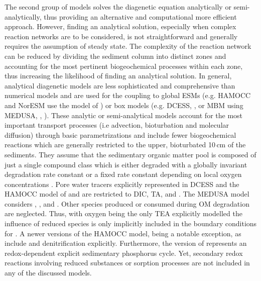 \documentclass[gmd, manuscript]{copernicus}
\begin{document}
The second group of models solves the diagenetic equation analytically or semi-analytically, thus providing an alternative and computational more efficient approach. 
However, finding an analytical solution, especially when complex reaction networks are to be considered, is not straightforward and generally requires the assumption of steady state. 
The complexity of the reaction network can be reduced by dividing the sediment column into distinct zones and accounting for the most pertinent biogeochemical processes 
within each zone, thus increasing the likelihood of finding an analytical solution. %
In general, analytical diagenetic models are less sophisticated and comprehensive than numerical models and are used for the coupling 
to global ESMs (e.g. HAMOCC and NorESM use the model of \citet{heinze_global_1999}) or box models (e.g. DCESS, \citeauthor{shaffer_presentation_2008}, \citeyear{shaffer_presentation_2008} or 
MBM using MEDUSA, \citeauthor{munhoven_glacialinterglacial_2007}, \citeyear{munhoven_glacialinterglacial_2007}). 
These analytic or semi-analytical models  account for the most important transport processes (i.e advection, bioturbation and molecular diffusion) through basic parametrizations and 
include fewer biogeochemical reactions which are generally restricted to the upper, bioturbated 10\,cm of the sediments. 
They assume that the sedimentary organic matter pool is composed of just a single compound class which is either degraded with a globally invariant degradation rate constant 
\citep[][]{munhoven_glacialinterglacial_2007} or a fixed rate constant depending on local oxygen concentrations \citep{shaffer_presentation_2008, palastanga_long_term_2011}. 
Pore water tracers explicitly represented in DCESS \citep{shaffer_presentation_2008} and the HAMOCC model of \citet{heinze_global_1999} and \citet{palastanga_long_term_2011} 
are restricted to DIC, TA,  and . The MEDUSA model \citep{munhoven_glacialinterglacial_2007} considers , ,  and . 
Other species produced or consumed during OM degradation are neglected. 
Thus, with oxygen being the only TEA explicitly modelled the influence of reduced species is only implicitly included in the boundary conditions for . 
A newer versions of the HAMOCC model, being a notable exception, as \citet{ilyina_global_2013} include  and denitrification explicitly. Furthermore, the version of 
\citet{palastanga_long_term_2011} represents an redox-dependent explicit sedimentary phosphorus cycle. Yet, secondary redox reactions involving reduced substances or sorption processes are not 
included in any of the discussed models. 
\end{document}
